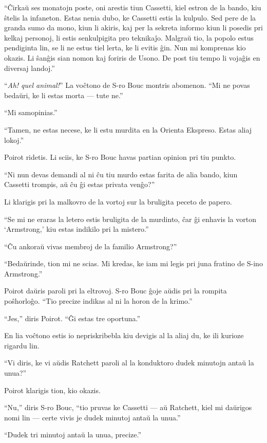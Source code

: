 ``Ĉirkaŭ ses monatojn poste, oni arestis tiun Cassetti, kiel estron de la bando, kiu ŝtelis la infaneton. Estas nenia dubo, ke Cassetti estis la kulpulo. Sed pere de la granda sumo da mono, kiun li akiris, kaj per la sekreta informo kiun li posedis pri kelkaj personoj, li estis senkulpigita pro teknikaĵo. Malgraŭ tio, la popolo estus pendiginta lin, se li ne estus tiel lerta, ke li evitis ĝin. Nun mi komprenas kio okazis. Li ŝanĝis sian nomon kaj foriris de Usono. De post tiu tempo li vojaĝis en diversaj landoj.''

``\emph{Ah! quel animal!}'' La voĉtono de S-ro Bouc montris abomenon. ``Mi ne povas bedaŭri, ke li estas morta --- tute ne.''

``Mi samopinias.''

``Tamen, ne estas necese, ke li estu murdita en la Orienta Ekspreso. Estas aliaj lokoj.''

Poirot ridetis. Li sciis, ke S-ro Bouc havas partian opinion pri tiu punkto.

``Ni nun devas demandi al ni ĉu tiu murdo estas farita de alia bando, kiun Cassetti trompis, aŭ ĉu ĝi estas privata venĝo?''

Li klarigis pri la malkovro de la vortoj sur la bruligita peceto de papero.

``Se mi ne eraras la letero estis bruligita de la murdinto, ĉar ĝi enhavis la vorton `Armstrong,' kiu estas indikilo pri la mistero.''

``Ĉu ankoraŭ vivas membroj de la familio Armstrong?''

``Bedaŭrinde, tion mi ne scias. Mi kredas, ke iam mi legis pri juna fratino de S-ino Armstrong.''

Poirot daŭris paroli pri la eltrovoj. S-ro Bouc ĝoje aŭdis pri la rompita poŝhorloĝo. ``Tio precize indikas al ni la horon de la krimo.''

``Jes,'' diris Poirot. ``Ĝi estas tre oportuna.''

En lia voĉtono estis io nepriskribebla kiu devigis al la aliaj du, ke ili kurioze rigardu lin.

``Vi diris, ke vi aŭdis Ratchett paroli al la konduktoro dudek minutojn antaŭ la unua?''

Poirot klarigis tion, kio okazis.

``Nu,'' diris S-ro Bouc, ``tio pruvas ke Cassetti --- aŭ Ratchett, kiel mi daŭrigos nomi lin --- certe vivis je dudek minutoj antaŭ la unua.''

``Dudek tri minutoj antaŭ la unua, precize.''

